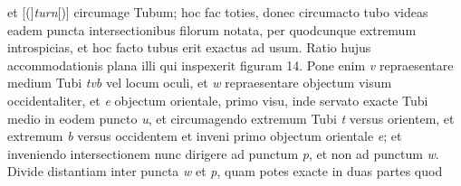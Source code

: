 et [(]\textit{turn}[)] circumage Tubum; hoc fac toties, donec circumacto tubo videas eadem puncta intersectionibus filorum notata, per quodcunque extremum introspicias, et hoc facto tubus erit exactus ad usum. Ratio hujus accommodationis plana illi qui inspexerit figuram 14. Pone enim \textit{v} repraesentare medium Tubi \textit{tvb} vel locum oculi, et \textit{w} repraesentare objectum visum occidentaliter, et \textit{e} objectum orientale, primo visu, inde servato exacte Tubi medio in eodem puncto \textit{u}, et circumagendo extremum Tubi \textit{t} versus orientem, et extremum \textit{b} versus occidentem et inveni primo objectum orientale \textit{e}; et inveniendo intersectionem nunc dirigere ad punctum \textit{p}, et non ad punctum \textit{w}. Divide distantiam inter puncta \textit{w} et \textit{p}, quam potes exacte in duas partes quod 
